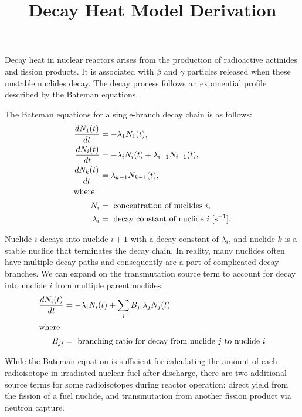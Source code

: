 \documentclass[letterpaper,11pt]{article}
\begin{document}
%
\title{Decay Heat Model Derivation}
\author{}
\date{}
%
\maketitle
%
Decay heat in nuclear reactors arises from the production of radioactive
actinides and fission products. It is associated with
$\beta$ and $\gamma$ particles released when these unstable nuclides decay.
The decay process follows an exponential profile described by the Bateman
equations.

The Bateman equations for a single-branch decay chain is as follows:
%
\begin{align}
\frac{dN_1 (t)}{dt} &= - \lambda_1 N_1 (t), \\
\frac{dN_i (t)}{dt} &= - \lambda_i N_i (t) + \lambda_{i-1} N_{i-1} (t), \\
\frac{dN_k (t)}{dt} &= \lambda_{k-1} N_{k-1} (t), \\
\intertext{where}
N_i &= \text{ concentration of nuclides $i$} ,\nonumber \\
\lambda_i &= \text{ decay constant of nuclide $i$ [s$^{-1}$].} \nonumber
\end{align}

Nuclide $i$ decays into nuclide $i+1$ with a decay constant of $\lambda_i$,
and nuclide $k$ is a stable nuclide that terminates the decay chain. In
reality, many nuclides often have multiple decay paths and consequently are a
part of complicated decay branches. We can expand on
the transmutation source term to account for decay into nuclide $i$ from
multiple parent nuclides.
%
\begin{align}
\frac{dN_i (t)}{dt} &= - \lambda_i N_i (t) + \sum_j B_{ji} \lambda_j N_j (t)
\\
\intertext{where}
B_{ji} &= \text{ branching ratio for decay from nuclide $j$ to nuclide $i$}
\nonumber
\end{align}

While the Bateman equation is sufficient for calculating the amount of each
radioisotope in irradiated nuclear fuel after discharge, there are two
additional source terms for some radioisotopes during reactor operation:
direct yield from the fission of a fuel nuclide, and transmutation from
another fission product via neutron capture.
\end{document}
